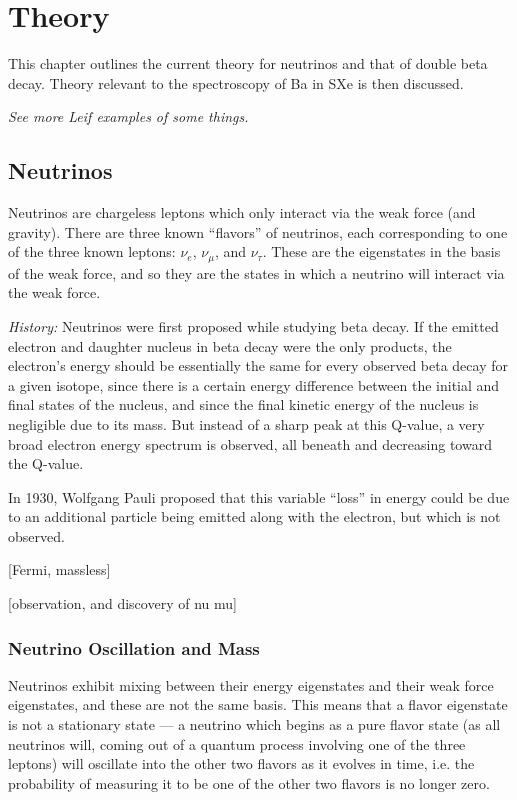 \chapter{Theory}

This chapter outlines the current theory for neutrinos and that of double beta decay.  Theory relevant to the spectroscopy of Ba in SXe is then discussed.

\emph{{\color{gray}See more Leif examples of some things.}}

\section{Neutrinos}

Neutrinos are chargeless leptons which only interact via the weak force (and gravity).  There are three known ``flavors'' of neutrinos, each corresponding to one of the three known leptons:  $\nu_{e}$, $\nu_{\mu}$, and $\nu_{\tau}$.  These are the eigenstates in the basis of the weak force, and so they are the states in which a neutrino will interact via the weak force.

{\color{gray}\emph{History:  }Neutrinos were first proposed while studying beta decay.  If the emitted electron and daughter nucleus in beta decay were the only products, the electron's energy should be essentially the same for every observed beta decay for a given isotope, since there is a certain energy difference between the initial and final states of the nucleus, and since the final kinetic energy of the nucleus is negligible due to its mass.  But instead of a sharp peak at this Q-value, a very broad electron energy spectrum is observed, all beneath and decreasing toward the Q-value.

In 1930, Wolfgang Pauli proposed that this variable ``loss'' in energy could be due to an additional particle being emitted along with the electron, but which is not observed.

[Fermi, massless]

[observation, and discovery of nu mu]}

\subsection{Neutrino Oscillation and Mass}

Neutrinos exhibit mixing between their energy eigenstates and their weak force eigenstates, and these are not the same basis.  This means that a flavor eigenstate is not a stationary state --- a neutrino which begins as a pure flavor state (as all neutrinos will, coming out of a quantum process involving one of the three leptons) will oscillate into the other two flavors as it evolves in time, i.e. the probability of measuring it to be one of the other two flavors is no longer zero.

